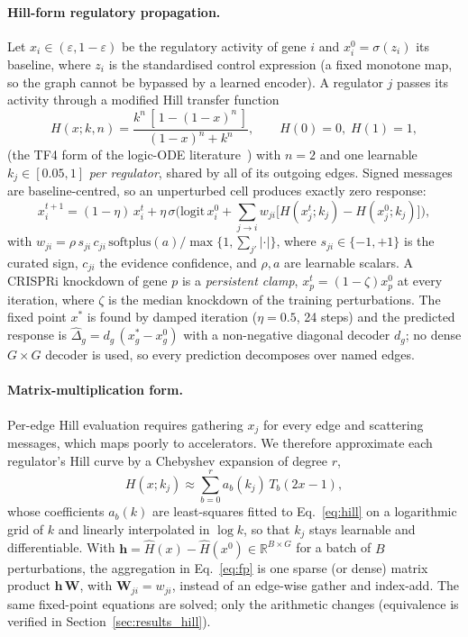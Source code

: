 \paragraph{Hill-form regulatory propagation.}
Let $x_i\in(\varepsilon,1-\varepsilon)$ be the regulatory activity of gene $i$ and $x^0_i=\sigma(z_i)$ its baseline, where $z_i$ is the standardised control expression (a fixed monotone map, so the graph cannot be bypassed by a learned encoder). A regulator $j$ passes its activity through a modified Hill transfer function
\begin{equation}
H(x;k,n)=\frac{k^{n}\,[\,1-(1-x)^{n}\,]}{(1-x)^{n}+k^{n}},\qquad H(0)=0,\;H(1)=1,
\label{eq:hill}
\end{equation}
(the TF4 form of the logic-ODE literature~\cite{wittmann2009,eduati2017}) with $n=2$ and one learnable $k_j\in[0.05,1]$ \emph{per regulator}, shared by all of its outgoing edges. Signed messages are baseline-centred, so an unperturbed cell produces exactly zero response:
\begin{equation}
x_i^{t+1}=(1-\eta)\,x_i^{t}+\eta\,\sigma\!\Big(\mathrm{logit}\,x_i^{0}+\sum_{j\to i} w_{ji}\big[H(x_j^{t};k_j)-H(x_j^{0};k_j)\big]\Big),
\label{eq:fp}
\end{equation}
with $w_{ji}=\rho\,s_{ji}\,c_{ji}\,\mathrm{softplus}(a)/\max\{1,\sum_{j'}|\cdot|\}$, where $s_{ji}\in\{-1,+1\}$ is the curated sign, $c_{ji}$ the evidence confidence, and $\rho,a$ are learnable scalars. A CRISPRi knockdown of gene $p$ is a \emph{persistent clamp}, $x_p^{t}=(1-\zeta)x_p^{0}$ at every iteration, where $\zeta$ is the median knockdown of the training perturbations. The fixed point $x^\ast$ is found by damped iteration ($\eta=0.5$, 24 steps) and the predicted response is $\hat\Delta_g=d_g\,(x^\ast_g-x^0_g)$ with a non-negative diagonal decoder $d_g$; no dense $G\times G$ decoder is used, so every prediction decomposes over named edges.

\paragraph{Matrix-multiplication form.}
Per-edge Hill evaluation requires gathering $x_j$ for every edge and scattering messages, which maps poorly to accelerators. We therefore approximate each regulator's Hill curve by a Chebyshev expansion of degree $r$,
\begin{equation}
H(x;k_j)\approx\sum_{b=0}^{r}a_b(k_j)\,T_b(2x-1),
\label{eq:cheb}
\end{equation}
whose coefficients $a_b(k)$ are least-squares fitted to Eq.~\eqref{eq:hill} on a logarithmic grid of $k$ and linearly interpolated in $\log k$, so that $k_j$ stays learnable and differentiable. With $\mathbf h=\hat H(x)-\hat H(x^0)\in\mathbb{R}^{B\times G}$ for a batch of $B$ perturbations, the aggregation in Eq.~\eqref{eq:fp} is one sparse (or dense) matrix product $\mathbf h\,\mathbf W$, with $\mathbf W_{ji}=w_{ji}$, instead of an edge-wise gather and index-add. The same fixed-point equations are solved; only the arithmetic changes (equivalence is verified in Section~\ref{sec:results_hill}).

